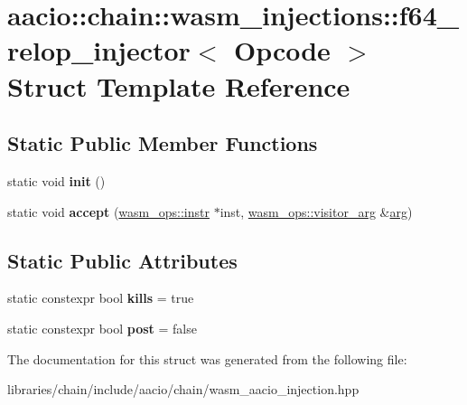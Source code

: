\hypertarget{structaacio_1_1chain_1_1wasm__injections_1_1f64__relop__injector}{}\section{aacio\+:\+:chain\+:\+:wasm\+\_\+injections\+:\+:f64\+\_\+relop\+\_\+injector$<$ Opcode $>$ Struct Template Reference}
\label{structaacio_1_1chain_1_1wasm__injections_1_1f64__relop__injector}
\subsection*{Static Public Member Functions}
\begin{DoxyCompactItemize}
\item 
\mbox{\label{structaacio_1_1chain_1_1wasm__injections_1_1f64__relop__injector_a915ca48f92933a58676f7ec1ad09c471}} 
static void {\bfseries init} ()
\item 
\mbox{\label{structaacio_1_1chain_1_1wasm__injections_1_1f64__relop__injector_a459286629dcebfe067fa6cf8be7464b1}} 
static void {\bfseries accept} (\mbox{\hyperlink{structaacio_1_1chain_1_1wasm__ops_1_1instr}{wasm\+\_\+ops\+::instr}} $\ast$inst, \mbox{\hyperlink{structaacio_1_1chain_1_1wasm__ops_1_1visitor__arg}{wasm\+\_\+ops\+::visitor\+\_\+arg}} \&\mbox{\hyperlink{unionarg}{arg}})
\end{DoxyCompactItemize}
\subsection*{Static Public Attributes}
\begin{DoxyCompactItemize}
\item 
\mbox{\label{structaacio_1_1chain_1_1wasm__injections_1_1f64__relop__injector_aaca3dd271b064cd0b1f8a7317d39eee3}} 
static constexpr bool {\bfseries kills} = true
\item 
\mbox{\label{structaacio_1_1chain_1_1wasm__injections_1_1f64__relop__injector_a7d7dd2f0efc298ba26a14ac6eda73f2b}} 
static constexpr bool {\bfseries post} = false
\end{DoxyCompactItemize}


The documentation for this struct was generated from the following file\+:\begin{DoxyCompactItemize}
\item 
libraries/chain/include/aacio/chain/wasm\+\_\+aacio\+\_\+injection.\+hpp\end{DoxyCompactItemize}
